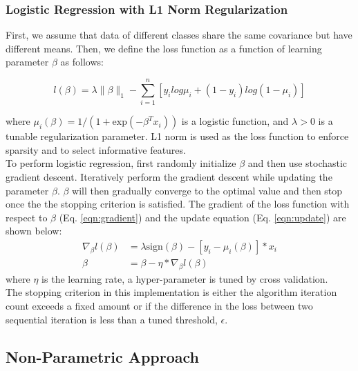 \documentclass[conference]{IEEEtran}
\begin{document}
\subsubsection{ Logistic Regression with L1 Norm Regularization}
First, we assume that data of different classes share the same covariance but have different means. Then, we define the loss function as a function of learning parameter $\beta$ as follows:
\begin{center}
\begin{equation}
l(\beta) = \lambda\|\beta\|_1-\sum_{i=1}^n [ y_i \textit{log} \mu_i + (1-y_i)\textit{log}(1-\mu_i) ]
\end{equation}
\end{center}
where $\mu_i(\beta)=1/(1+\text{exp}(-\beta^Tx_i))$ is a logistic function, and $\lambda>0$ is a tunable regularization parameter. L1 norm is used as the loss function to enforce sparsity and to select informative features.\\
To perform logistic regression, first randomly initialize $\beta$ and then use stochastic gradient descent. Iteratively perform the gradient descent while updating the parameter $\beta$. $\beta$ will then gradually converge to the optimal value and then stop once the the stopping criterion is satisfied. The gradient of the loss function with respect to $\beta$ (Eq. \ref{eqn:gradient}) and the update equation (Eq. \ref{eqn:update}) are shown below: \\
\begin{align}
\nabla_\beta l(\beta) &=  \lambda \text{sign}(\beta)-[y_i-\mu_i(\beta)]*x_i  \label{eqn:gradient} \\
\beta &= \beta-\eta*\nabla_\beta l(\beta) \label{eqn:update}
\end{align}
where $\eta$ is the learning rate, a hyper-parameter is tuned by cross validation.\\
The stopping criterion in this implementation is either the algorithm iteration count exceeds a fixed amount or if the difference in the loss between two sequential iteration is less than a tuned threshold, $\epsilon$.

\subsection{Non-Parametric Approach}
\end{document}
